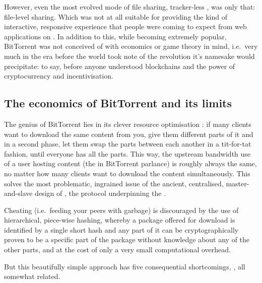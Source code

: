 However, even the most evolved mode of  file sharing, tracker-less  \cite{pouwelse2005bittorrent}, was only that: file-level sharing. Which was not at all suitable for providing the kind of interactive, responsive experience that people were coming to expect from web applications on . In addition to this, while becoming extremely popular, BitTorrent was not conceived of with economics or game theory in mind, i.e.\ very much in the era before the world took note of the revolution it's namesake would precipitate: to say, before anyone understood blockchains and the power of cryptocurrency and incentivisation.

\subsection{The economics of BitTorrent and its limits \statusgreen}

The genius of BitTorrent lies in its clever resource optimisation \cite{cohen2003incentives}: if many clients want to download the same content from you, give them different parts of it and in a second phase, let them swap the parts between each another in a tit-for-tat fashion, until everyone has all the parts. This way, the upstream bandwidth use of a user hosting  content (the  in BitTorrent parlance) is roughly always the same, no matter how many clients want to download the content simultaneously. This solves the most problematic, ingrained issue of the ancient, centralised, master-and-slave design of , the protocol underpinning the .

Cheating (i.e.\ feeding your peers with garbage) is discouraged by the use of hierarchical, piece-wise hashing, whereby a package offered for download is identified by a single short hash and any part of it can be cryptographically proven to be a specific part of the package without knowledge about any of the other parts, and at the cost of only a very small computational overhead. 

But this beautifully simple approach has five consequential shortcomings, \cite{locher2006free,piatek2007incentives}, all somewhat related.

